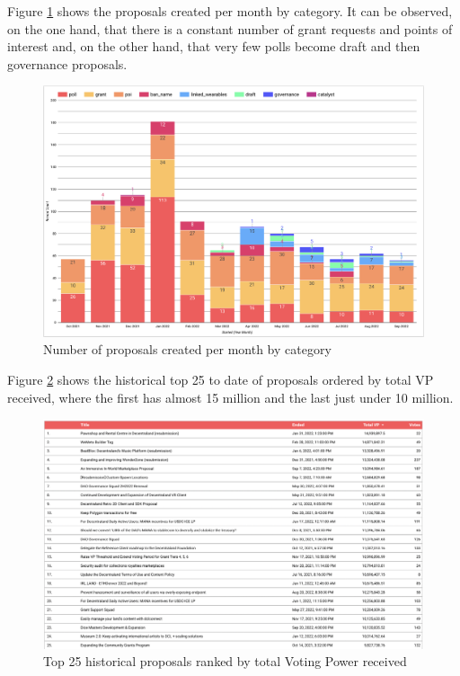 \documentclass[MSE,Master,english]{twbook}%
\begin{document}
Figure \ref{fig:proposals_by_month} shows the proposals created per month by category. It can be observed, on the one hand, that there is a constant number of grant requests and points of interest and, on the other hand, that very few polls become draft and then governance proposals.
\begin{figure}[H]
  \centering
  \includegraphics[width=\textwidth]{metrics/proposals_by_month.png}
  \caption{Number of proposals created per month by category}
  \label{fig:proposals_by_month}
\end{figure}

Figure \ref{fig:top_proposals} shows the historical top 25 to date of proposals ordered by total VP received, where the first has almost 15 million and the last just under 10 million.
\begin{figure}[H]
  \centering
  \includegraphics[width=\textwidth]{metrics/top_proposals.png}
  \caption{Top 25 historical proposals ranked by total Voting Power received}
  \label{fig:top_proposals}
\end{figure}
\end{document}
